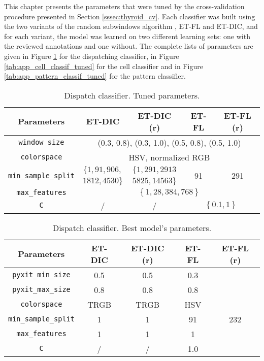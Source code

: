 \label{app:cross_val}

This chapter presents the parameters that were tuned by the cross-validation procedure presented in Section \ref{sssec:thyroid_cv}. Each classifier was built using the two variants of the random subwindows algorithm , ET-FL and ET-DIC, and for each variant, the model was learned on two different learning sets: one with the reviewed annotations and one without. The complete lists of parameters are given in Figure \ref{tab:app_disp_classif_tuned} for the dispatching classifier, in Figure \ref{tab:app_cell_classif_tuned} for the cell classifier and in Figure \ref{tab:app_pattern_classif_tuned} for the pattern classifier.

\begin{table}
	\center 
	\begin{tabular}{|c|cccc|}
		\hline
		Parameters & ET-DIC & ET-DIC (r) & ET-FL & ET-FL (r) \\
		\hline		
		\texttt{window size} & \multicolumn{4}{|c|}{(0.3, 0.8), (0.3, 1.0), (0.5, 0.8), (0.5, 1.0)} \\
		\texttt{colorspace} & \multicolumn{4}{|c|}{HSV, normalized RGB} \\
		\multirow{2}{*}{\texttt{min\_sample\_split}} & $\{1, 91, 906,$ &  $\{1, 291, 2913$ & \multirow{2}{*}{91} & \multirow{2}{*}{291}\\
		& $1812, 4530\}$ & $5825, 14563 \}$ & & \\
		\texttt{max\_features} & \multicolumn{4}{|c|}{$\left\{1, 28, 384, 768\right\}$}\\ 
		\texttt{C} & / & / & \multicolumn{2}{c|}{$\left\{0.1, 1\right\}$}\\
		\hline
	\end{tabular}
	\caption{Dispatch classifier. Tuned parameters.}
	\label{tab:app_disp_classif_tuned}
\end{table}

\begin{table}
	\small
	\center 
	\begin{tabular}{|c|c|c|c|c|}
		\hline
		Parameters & ET-DIC & ET-DIC (r) & ET-FL & ET-FL (r) \\
		\hline		
		\texttt{pyxit\_min\_size} & 0.5 & 0.5 & 0.3 & \\
		\texttt{pyxit\_max\_size} & 0.8 & 0.8 & 0.8 & \\
		\texttt{colorspace} & TRGB & TRGB & HSV & \\
		\texttt{min\_sample\_split} & 1 & 1 & 91 & 232\\
		\texttt{max\_features} & 1 & 1 & 1 & \\ 
		\texttt{C} & / & / & 1.0 & \\
		\hline
	\end{tabular}
	\caption{Dispatch classifier. Best model's parameters.}
	\label{tab:dispatch_classif_best_params}
\end{table}

